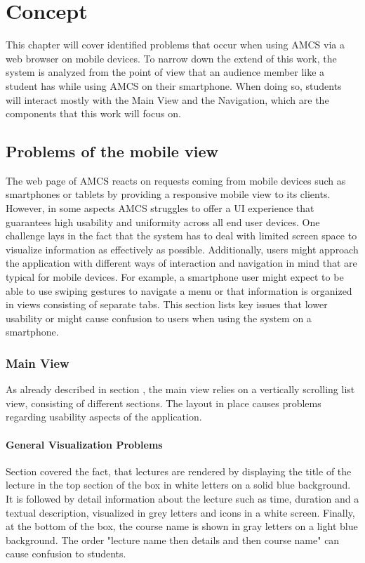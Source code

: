 \chapter{Concept}
This chapter will cover identified problems that occur when using AMCS via a web browser on mobile
devices. To narrow down the extend of this work, the system is analyzed from the point of view that an audience member like a student has while using AMCS on their smartphone. When doing so, students will interact mostly with the Main View and the Navigation, which are the components that this work will focus on.

\section{Problems of the mobile view}

The web page of AMCS reacts on requests coming from mobile devices such as smartphones or tablets by providing a responsive mobile view to its clients. However, in some aspects AMCS struggles to offer a UI experience that guarantees high usability and uniformity across all end user devices.
One challenge lays in the fact that the system has to deal with limited screen space to visualize information as effectively as possible. Additionally, users might approach the application with different ways of interaction and navigation in mind that are typical for mobile devices. For example, a smartphone user might expect to be able to use swiping gestures to navigate a menu or that information is organized in views consisting of separate tabs. This section lists key issues that lower usability or might cause confusion to users when using the system on a smartphone.

\subsection{Main View}
As already described in section \todosct, the main view relies on a vertically scrolling list view, consisting of different sections. The layout in place causes problems regarding usability aspects of the application.

\subsubsection{General Visualization Problems}

Section \todosct covered the fact, that lectures are rendered by displaying the title of the lecture in the top section of the box in white letters on a solid blue background. It is followed by detail information about the lecture such as time, duration and a textual description, visualized in grey letters and icons in a white screen. Finally, at the bottom of the box, the course name is shown in gray letters on a light blue background. The order "lecture name then details and then course name" can cause confusion to students.

